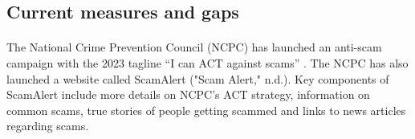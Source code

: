 \documentclass[a4paper]{article}
\begin{document}
\begin{multicols}{2}
    \subsection{Current measures and gaps}
    \paragraph{} The National Crime Prevention Council (NCPC) has launched an
	anti-scam campaign with the 2023 tagline ``I can ACT against
    scams'' \parencite{Sun.2023}. The NCPC has also launched
	a website called ScamAlert ("Scam Alert," n.d.). Key components
	of ScamAlert include more details on NCPC’s ACT strategy,
	information on common scams, true stories of people getting
	scammed and links to news articles regarding scams.



\end{multicols}

\newpage

\nocite{*}
\printbibliography[heading=bibintoc,title={References}]

\newpage


\begin{appendices}
\end{appendices}


\end{document}
